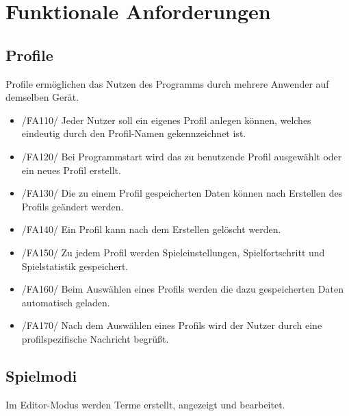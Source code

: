 \section{Funktionale Anforderungen}

\subsection{Profile}

Profile ermöglichen das Nutzen des Programms durch mehrere Anwender auf demselben Gerät.

\begin{itemize}
\item /FA110/ Jeder Nutzer soll ein eigenes Profil anlegen können, welches eindeutig durch den Profil-Namen gekennzeichnet ist. 
\item /FA120/ Bei Programmstart wird das zu benutzende Profil ausgewählt oder ein neues Profil erstellt.
\item /FA130/ Die zu einem Profil gespeicherten Daten können nach Erstellen des Profils geändert werden.
\item /FA140/ Ein Profil kann nach dem Erstellen gelöscht werden.
\item /FA150/ Zu jedem Profil werden Spieleinstellungen, Spielfortschritt und Spielstatistik gespeichert.
\item /FA160/ Beim Auswählen eines Profils werden die dazu gespeicherten Daten automatisch geladen.
\item /FA170/ Nach dem Auswählen eines Profils wird der Nutzer durch eine profilspezifische Nachricht begrüßt.
\end{itemize}

\subsection{Spielmodi}

Im Editor-Modus werden Terme erstellt, angezeigt und bearbeitet.

